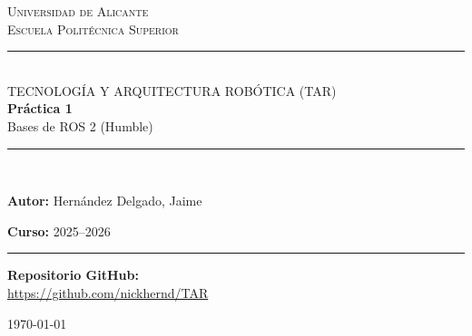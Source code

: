\begin{titlepage}
  \centering

  \vspace*{1cm}

  {\Large \textsc{Universidad de Alicante}}\\[0.3cm]
  {\large \textsc{Escuela Politécnica Superior}}\\[0.5cm]
  \rule{\linewidth}{0.4pt}\\[0.4cm]

  {\large TECNOLOGÍA Y ARQUITECTURA ROBÓTICA (TAR)}\\[1.5cm]

  {\Huge \bfseries \color{azulROS} Práctica 1}\\[0.5cm]
  {\LARGE  Bases de ROS 2 (Humble)}\\[2cm]

  \rule{\linewidth}{0.4pt}\\[0.8cm]

  \begin{minipage}{0.45\textwidth}
    \begin{flushleft}
      \textbf{Autor:}
     	Hernández Delgado, Jaime
    \end{flushleft}
  \end{minipage}
  \hfill
  \begin{minipage}{0.45\textwidth}
    \begin{flushright}
      \textbf{Curso:} 2025--2026\\
    \end{flushright}
  \end{minipage}

  \vspace{1.5cm}
  \rule{\linewidth}{0.4pt}

  \vfill

  \textbf{Repositorio GitHub:}\\
  \url{https://github.com/nickhernd/TAR}

  \vspace{1cm}
  {\large \today}

\end{titlepage}

\newpage
